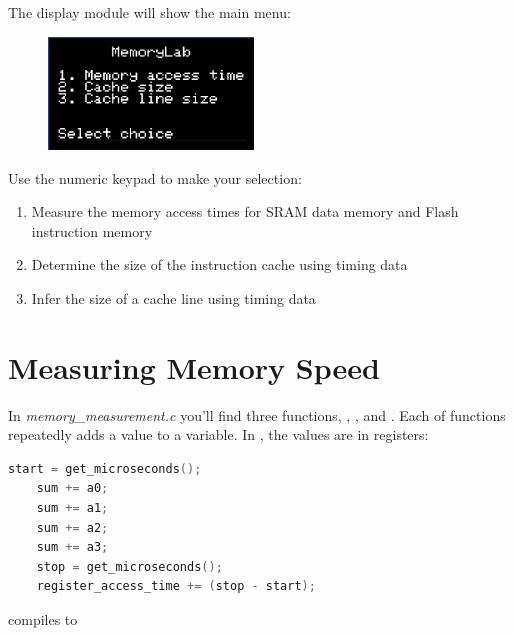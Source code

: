 
The display module will show the main menu:

\begin{figure}[h]
    \includegraphics[height=3cm]{Mk4Screens/MainMenu}
\end{figure}

Use the numeric keypad to make your selection:

\begin{enumerate}
    \item Measure the memory access times for SRAM data memory and Flash instruction memory
    \item Determine the size of the instruction cache using timing data
    \item Infer the size of a cache line using timing data
\end{enumerate}


\section{Measuring Memory Speed}

In \textit{memory\_measurement.c} you'll find three functions,
, , and .
Each of functions repeatedly adds a value to a variable.
In , the values are in registers:

\begin{lstlisting}[language=c]
    start = get_microseconds();
    sum += a0;
    sum += a1;
    sum += a2;
    sum += a3;
    stop = get_microseconds();
    register_access_time += (stop - start);
\end{lstlisting}

compiles to

